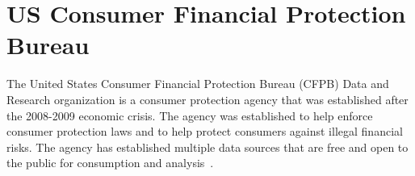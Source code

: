 \section{US Consumer Financial Protection Bureau}

The United States Consumer Financial Protection Bureau (CFPB) Data and Research
organization is a consumer protection agency that was established after the
2008-2009 economic crisis.  The agency was established to help enforce consumer
protection laws and to help protect consumers against illegal financial risks.
The agency has established multiple data sources that are free and open to the
public for consumption and analysis~\cite{hid-sp18-505-CFPB2018}.
